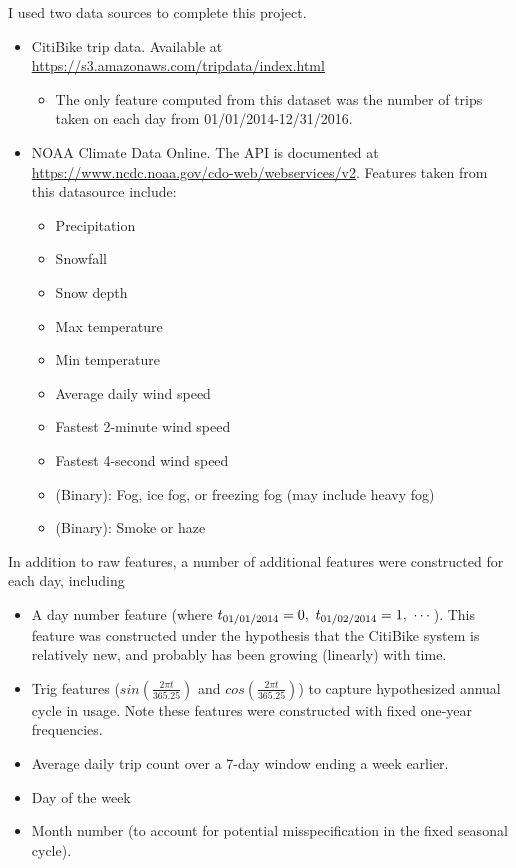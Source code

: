 \documentclass[12pt]{article}
\begin{document}
I used two data sources to complete this project.
\begin{itemize}
\item CitiBike trip data. Available at \url{https://s3.amazonaws.com/tripdata/index.html}
\begin{itemize}
	\item The only feature computed from this dataset was the number of trips taken on each day from 01/01/2014-12/31/2016.
\end{itemize}
\item NOAA Climate Data Online. The API is documented at \url{https://www.ncdc.noaa.gov/cdo-web/webservices/v2}. Features taken from this datasource include:
\begin{itemize}
    \item Precipitation
    \item Snowfall
    \item Snow depth
    \item Max temperature
    \item Min temperature
    \item Average daily wind speed
    \item Fastest 2-minute wind speed
    \item Fastest 4-second wind speed
    \item (Binary): Fog, ice fog, or freezing fog (may include heavy fog)
    \item (Binary): Smoke or haze
\end{itemize}
\end{itemize}

In addition to raw features, a number of additional features were constructed for each day, including
\begin{itemize}
\item A day number feature (where $t_{\begin{tiny}\textrm{01/01/2014}\end{tiny}} = 0,~t_{\begin{tiny}\textrm{01/02/2014}\end{tiny}}= 1,~\cdots$). This feature was constructed under the hypothesis that the CitiBike system is relatively new, and probably has been growing (linearly) with time.
\item Trig features ($sin\left(\frac{2\pi t}{365.25}\right)$ and $cos\left(\frac{2\pi t}{365.25}\right)$) to capture hypothesized annual cycle in usage. Note these features were constructed with fixed one-year frequencies.
\item Average daily trip count over a 7-day window ending a week earlier.
\item Day of the week
\item Month number (to account for potential misspecification in the fixed seasonal cycle).
\end{itemize}
\end{document}
